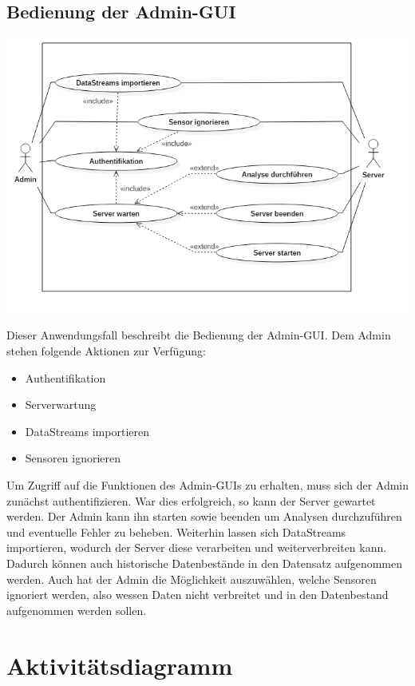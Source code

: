     \subsection{Bedienung der Admin-GUI}
        \includegraphics[width=1\linewidth]{diagrams/UseCaseDiagram2_Final.png}
        
        Dieser Anwendungsfall beschreibt die Bedienung der Admin-GUI. Dem Admin stehen folgende Aktionen zur Verfügung:
        \begin{itemize}
            \item Authentifikation
            \item Serverwartung
            \item DataStreams importieren
            \item Sensoren ignorieren
        \end{itemize}
        Um Zugriff auf die Funktionen des Admin-GUIs zu erhalten, muss sich der Admin zunächst authentifizieren. War dies erfolgreich, so 
        kann der Server gewartet werden. Der Admin kann ihn starten sowie beenden um Analysen durchzuführen und eventuelle 
        Fehler zu beheben. Weiterhin lassen sich DataStreams importieren, wodurch der Server diese verarbeiten und weiterverbreiten 
        kann. Dadurch können auch historische Datenbestände in den Datensatz aufgenommen werden. Auch hat der Admin die 
        Möglichkeit auszuwählen, welche Sensoren ignoriert werden, also wessen Daten nicht verbreitet und in den Datenbestand 
        aufgenommen werden sollen.
        
\section{Aktivitätsdiagramm}
